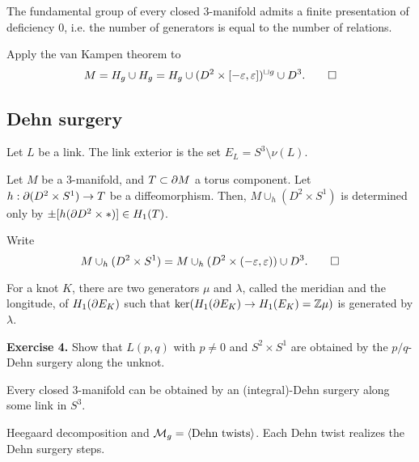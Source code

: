 \documentclass{../../small}
\begin{document}
\begin{cor}
The fundamental group of every closed 3-manifold admits a finite presentation of deficiency 0, i.e. the number of generators is equal to the number of relations.
\end{cor}
\begin{pf}
Apply the van Kampen theorem to
\[M=H_g\cup H_g=H_g\cup(D^2\times[-\varepsilon,\varepsilon])^{\sqcup g}\cup D^3.\qedhere\]
\end{pf}

\subsection{Dehn surgery}
Let $L$ be a link.
The link exterior is the set $E_L=S^3\setminus\nu(L)$.

\begin{prop}
Let $M$ be a 3-manifold, and $T\subset\pd M$ a torus component.
Let $h:\pd(D^2\times S^1)\to T$ be a diffeomorphism.
Then, $M\cup_h(D^2\times S^1)$ is determined only by $\pm[h(\pd D^2\times*)]\in H_1(T)$.
\end{prop}
\begin{pf}
Write
\[M\cup_h(D^2\times S^1)=M\cup_h(D^2\times(-\varepsilon,\varepsilon))\cup D^3.\qedhere\]
\end{pf}
For a knot $K$, there are two generators $\mu$ and $\lambda$, called the meridian and the longitude, of $H_1(\pd E_K)$ such that $\ker(H_1(\pd E_K)\to H_1(E_K)=\Z\mu)$ is generated by $\lambda$.

\textbf{Exercise 4.} Show that $L(p,q)$ with $p\ne0$ and $S^2\times S^1$ are obtained by the $p/q$-Dehn surgery along the unknot.

\begin{thm}
Every closed 3-manifold can be obtained by an (integral)-Dehn surgery along some link in $S^3$.
\end{thm}
\begin{pf}[Sketch]
Heegaard decomposition and $\mathcal{M}_g=\langle\text{Dehn twists}\rangle$.
Each Dehn twist realizes the Dehn surgery steps.
\end{pf}
\end{document}
